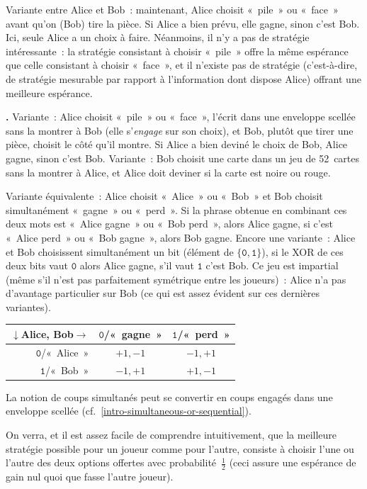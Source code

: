 \documentclass[12pt,a4paper]{article}
\theoremstyle{definition}
\newcommand\thingy{%
\refstepcounter{comcnt}\smallskip\noindent\textbf{\thecomcnt.} }
\begin{document}
Variante entre Alice et Bob : maintenant, Alice choisit « pile » ou
« face » avant qu'on (Bob) tire la pièce.  Si Alice a bien prévu, elle
gagne, sinon c'est Bob.  Ici, seule Alice a un choix à faire.
Néanmoins, il n'y a pas de stratégie intéressante : la stratégie
consistant à choisir « pile » offre la même espérance que celle
consistant à choisir « face », et il n'existe pas de stratégie
(c'est-à-dire, de stratégie mesurable par rapport à l'information dont
dispose Alice) offrant une meilleure espérance.

\thingy Variante : Alice choisit « pile » ou « face », l'écrit dans
une enveloppe scellée sans la montrer à Bob (elle s'\emph{engage} sur
son choix), et Bob, plutôt que tirer une pièce, choisit le côté qu'il
montre.  Si Alice a bien deviné le choix de Bob, Alice gagne, sinon
c'est Bob.  Variante : Bob choisit une carte dans un jeu de 52 cartes
sans la montrer à Alice, et Alice doit deviner si la carte est noire ou
rouge.

Variante équivalente : Alice choisit « Alice » ou « Bob » et Bob
choisit simultanément « gagne » ou « perd ».  Si la phrase obtenue en
combinant ces deux mots est « Alice gagne » ou « Bob perd », alors
Alice gagne, si c'est « Alice perd » ou « Bob gagne », alors Bob
gagne.  Encore une variante : Alice et Bob choisissent simultanément
un bit (élément de $\{\mathtt{0},\mathtt{1}\}$), si le XOR de ces deux
bits vaut $\mathtt{0}$ alors Alice gagne, s'il vaut $\mathtt{1}$ c'est
Bob.  Ce jeu est impartial (même s'il n'est pas parfaitement
symétrique entre les joueurs) : Alice n'a pas d'avantage particulier
sur Bob (ce qui est assez évident sur ces dernières variantes).

\begin{center}
\begin{tabular}{r|cc}
$\downarrow$Alice, Bob$\rightarrow$&$\mathtt{0}$/« gagne »&$\mathtt{1}$/« perd »\\\hline
$\mathtt{0}$/« Alice »&$+1,-1$&$-1,+1$\\
$\mathtt{1}$/« Bob »&$-1,+1$&$+1,-1$\\
\end{tabular}
\end{center}

La notion de coups simultanés peut se convertir en coups engagés dans
une enveloppe scellée (cf. \ref{intro-simultaneous-or-sequential}).

On verra, et il est assez facile de comprendre intuitivement, que la
meilleure stratégie possible pour un joueur comme pour l'autre,
consiste à choisir l'une ou l'autre des deux options offertes avec
probabilité $\frac{1}{2}$ (ceci assure une espérance de gain nul quoi
que fasse l'autre joueur).
\end{document}

